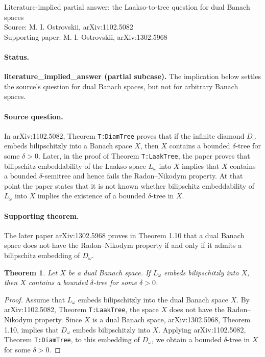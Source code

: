 \documentclass[11pt]{article}
\newtheorem*{theorem}{Theorem}
\begin{document}
\begin{center}
{\Large Literature-implied partial answer: the Laakso-to-tree question for dual Banach spaces}\\[4pt]
{\normalsize Source: M. I. Ostrovskii, arXiv:1102.5082}\\
{\normalsize Supporting paper: M. I. Ostrovskii, arXiv:1302.5968}
\end{center}

\paragraph{Status.}
\textbf{literature\_implied\_answer (partial subcase).}
The implication below settles the source's question for dual Banach spaces,
but not for arbitrary Banach spaces.

\paragraph{Source question.}
In arXiv:1102.5082, Theorem \texttt{T:DiamTree} proves that if the infinite
diamond $D_\omega$ embeds bilipschitzly into a Banach space $X$, then $X$
contains a bounded $\delta$-tree for some $\delta>0$.  Later, in the proof of
Theorem \texttt{T:LaakTree}, the paper proves that bilipschitz embeddability
of the Laakso space $L_\omega$ into $X$ implies that $X$ contains a bounded
$\delta$-semitree and hence fails the Radon--Nikodym property.  At that point
the paper states that it is not known whether bilipschitz embeddability of
$L_\omega$ into $X$ implies the existence of a bounded $\delta$-tree in $X$.

\paragraph{Supporting theorem.}
The later paper arXiv:1302.5968 proves in Theorem 1.10 that a dual Banach
space does not have the Radon--Nikodym property if and only if it admits a
bilipschitz embedding of $D_\omega$.

\begin{theorem}
Let $X$ be a dual Banach space.  If $L_\omega$ embeds bilipschitzly into $X$,
then $X$ contains a bounded $\delta$-tree for some $\delta>0$.
\end{theorem}

\begin{proof}
Assume that $L_\omega$ embeds bilipschitzly into the dual Banach space $X$.
By arXiv:1102.5082, Theorem \texttt{T:LaakTree}, the space $X$ does not have
the Radon--Nikodym property.  Since $X$ is a dual Banach space, arXiv:1302.5968,
Theorem 1.10, implies that $D_\omega$ embeds bilipschitzly into $X$.  Applying
arXiv:1102.5082, Theorem \texttt{T:DiamTree}, to this embedding of
$D_\omega$, we obtain a bounded $\delta$-tree in $X$ for some $\delta>0$.
\end{proof}
\end{document}
